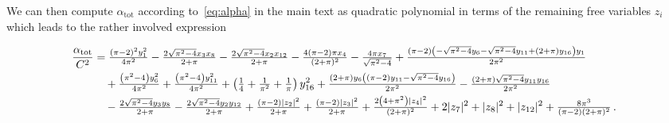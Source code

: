 \documentclass[prl,a4paper,notitlepage,twocolumn,superscriptaddress,longbibliography,reprint]{revtex4-2}
\begin{document}
We can then compute $\alpha_{\mathrm{tot}}$ according to~\eqref{eq:alpha} in the main text as quadratic polynomial in terms of the remaining free variables $z_i$ which leads to the rather involved expression
\begin{widetext}
\begin{align}
\begin{split}
    \hspace{-3mm}\frac{\alpha_{\mathrm{tot}}}{C^2}&
    =\tfrac{(\pi -2)^2 y_1^2}{4 \pi ^2}-\tfrac{2 \sqrt{\pi ^2-4} x_3 x_8}{2+\pi }-\tfrac{2 \sqrt{\pi ^2-4} x_2 x_{12}}{2+\pi }-\tfrac{4 (\pi -2) \pi  x_4}{(2+\pi )^2}-\tfrac{4 \pi  x_7}{\sqrt{\pi ^2-4}}+\tfrac{(\pi -2) \left(-\sqrt{\pi ^2-4} y_6-\sqrt{\pi ^2-4} y_{11}+(2+\pi ) y_{16}\right) y_1}{2 \pi ^2}\\
    &\quad+\tfrac{\left(\pi ^2-4\right) y_6^2}{4 \pi ^2}+\tfrac{\left(\pi ^2-4\right) y_{11}^2}{4 \pi ^2}+\left(\tfrac{1}{4}+\tfrac{1}{\pi ^2}+\tfrac{1}{\pi }\right) y_{16}^2+\tfrac{(2+\pi ) y_6 \left((\pi -2) y_{11}-\sqrt{\pi ^2-4} y_{16}\right)}{2 \pi ^2}-\tfrac{(2+\pi ) \sqrt{\pi ^2-4} y_{11} y_{16}}{2 \pi ^2}\\
    &\quad-\tfrac{2 \sqrt{\pi ^2-4} y_3 y_8}{2+\pi }-\tfrac{2 \sqrt{\pi ^2-4} y_2 y_{12}}{2+\pi }+\tfrac{(\pi -2) |z_2|^2}{2+\pi }+\tfrac{(\pi -2) |z_3|^2}{2+\pi }+\tfrac{2 \left(4+\pi ^2\right) |z_4|^2}{(2+\pi )^2}+2 |z_7|^2+|z_8|^2+|z_{12}|^2+\tfrac{8 \pi ^3}{(\pi -2) (2+\pi )^2}\,.
\end{split}
\end{align}
\end{widetext}
\end{document}
